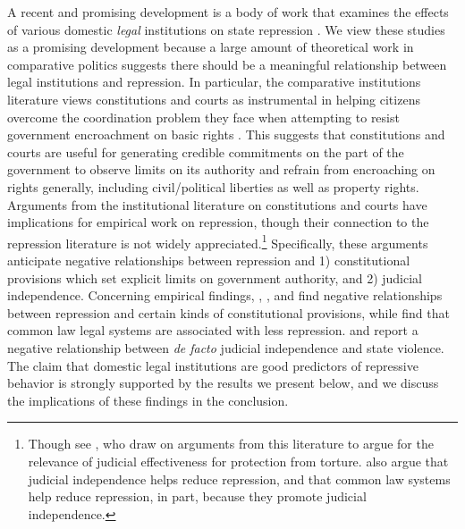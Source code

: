 \documentclass[11pt]{article}
\begin{document}
A recent and promising development is a body of work that examines the effects of various domestic {\em legal} institutions on state repression \citep{Davenport1996JOP,Cross1999,KeithTatePoe2009,PowellStaton2009,Mitchell2013}. We view these studies as a promising development because a large amount of theoretical work in comparative politics suggests there should be a meaningful relationship between legal institutions and repression. In particular, the comparative institutions literature views constitutions and courts as instrumental in helping citizens overcome the coordination problem they face when attempting to resist government encroachment on basic rights \citep{NorthWeingast1989, Ordeshook1992, Weingast1997, Carey2000, Vanberg2005, ElkinsGinsburgMelton2009}. This suggests that constitutions and courts are useful for generating credible commitments on the part of the government to observe limits on its authority and refrain from encroaching on rights generally, including civil/political liberties as well as property rights. Arguments from the institutional literature on constitutions and courts have implications for empirical work on repression, though their connection to the repression literature is not widely appreciated.\footnote{Though see \citet{PowellStaton2009}, who draw on arguments from this literature to argue for the relevance of judicial effectiveness for protection from torture. \citet{Mitchell2013} also argue that judicial independence helps reduce repression, and that common law systems help reduce repression, in part, because they promote judicial independence.} Specifically, these arguments anticipate negative relationships between repression and 1) constitutional provisions which set explicit limits on government authority, and 2) judicial independence. Concerning empirical findings, \citet{Davenport1996JOP}, \citet{Cross1999}, and \citet{KeithTatePoe2009} find negative relationships between repression and certain kinds of constitutional provisions, while \citet{Mitchell2013} find that common law legal systems are associated with less repression. \citet{PowellStaton2009} and \citet{Mitchell2013} report a negative relationship between {\it de facto} judicial independence and state violence. The claim that domestic legal institutions are good predictors of repressive behavior is strongly supported by the results we present below, and we discuss the implications of these findings in the conclusion. 
\end{document}
